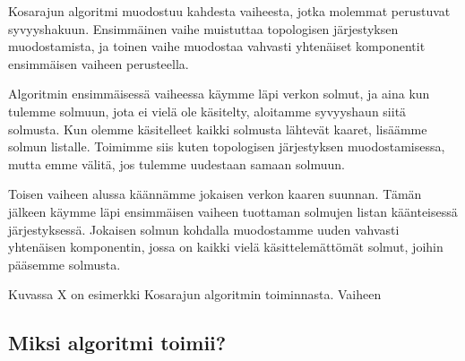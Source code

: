 Kosarajun algoritmi muodostuu kahdesta vaiheesta,
jotka molemmat perustuvat syvyyshakuun.
Ensimmäinen vaihe muistuttaa topologisen järjestyksen
muodostamista, ja toinen vaihe muodostaa
vahvasti yhtenäiset komponentit ensimmäisen vaiheen perusteella.

Algoritmin ensimmäisessä vaiheessa
käymme läpi verkon solmut, ja aina kun tulemme solmuun,
jota ei vielä ole käsitelty, aloitamme syvyyshaun siitä solmusta.
Kun olemme käsitelleet kaikki solmusta lähtevät kaaret,
lisäämme solmun listalle.
Toimimme siis kuten topologisen järjestyksen muodostamisessa,
mutta emme välitä, jos tulemme uudestaan samaan solmuun.

Toisen vaiheen alussa käännämme jokaisen verkon kaaren suunnan.
Tämän jälkeen käymme läpi ensimmäisen vaiheen tuottaman
solmujen listan kääntei\-sessä järjestyksessä.
Jokaisen solmun kohdalla muodostamme uuden vahvasti yhtenäisen
komponentin, jossa on kaikki vielä käsittelemättömät solmut,
joihin pääsemme solmusta.

Kuvassa X on esimerkki Kosarajun algoritmin toiminnasta.
Vaiheen 

\subsection{Miksi algoritmi toimii?}
